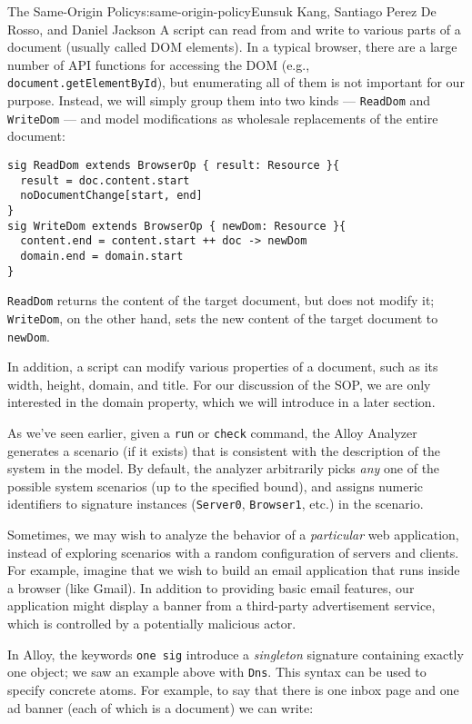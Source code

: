 \begin{aosachapter}{The Same-Origin Policy}{s:same-origin-policy}{Eunsuk Kang, Santiago Perez De Rosso, and Daniel Jackson}
A script can read from and write to various parts of a document (usually
called DOM elements). In a typical browser, there are a large number of
API functions for accessing the DOM (e.g.,
\texttt{document.getElementById}), but enumerating all of them is not
important for our purpose. Instead, we will simply group them into two
kinds --- \texttt{ReadDom} and \texttt{WriteDom} --- and model
modifications as wholesale replacements of the entire document:

\begin{verbatim}
sig ReadDom extends BrowserOp { result: Resource }{
  result = doc.content.start
  noDocumentChange[start, end]
}
sig WriteDom extends BrowserOp { newDom: Resource }{
  content.end = content.start ++ doc -> newDom
  domain.end = domain.start
}
\end{verbatim}

\texttt{ReadDom} returns the content of the target document, but does
not modify it; \texttt{WriteDom}, on the other hand, sets the new
content of the target document to \texttt{newDom}.

In addition, a script can modify various properties of a document, such
as its width, height, domain, and title. For our discussion of the SOP,
we are only interested in the domain property, which we will introduce
in a later section.

\label{example-applications}

As we've seen earlier, given a \texttt{run} or \texttt{check} command,
the Alloy Analyzer generates a scenario (if it exists) that is
consistent with the description of the system in the model. By default,
the analyzer arbitrarily picks \emph{any} one of the possible system
scenarios (up to the specified bound), and assigns numeric identifiers
to signature instances (\texttt{Server0}, \texttt{Browser1}, etc.) in
the scenario.

Sometimes, we may wish to analyze the behavior of a \emph{particular}
web application, instead of exploring scenarios with a random
configuration of servers and clients. For example, imagine that we wish
to build an email application that runs inside a browser (like Gmail).
In addition to providing basic email features, our application might
display a banner from a third-party advertisement service, which is
controlled by a potentially malicious actor.

In Alloy, the keywords \texttt{one sig} introduce a \emph{singleton}
signature containing exactly one object; we saw an example above with
\texttt{Dns}. This syntax can be used to specify concrete atoms. For
example, to say that there is one inbox page and one ad banner (each of
which is a document) we can write:


\end{aosachapter}
